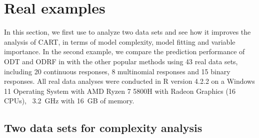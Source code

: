 \section{Real examples} \label{sec:examples}

In this section, we first use  to analyze two data sets and see how it improves the analysis of CART,  in terms of  model complexity, model fitting and variable importance. In the second example, we compare the prediction performance of ODT and ODRF in  with the other popular methods using 43 real data sets, including 20 continuous responses, 8 multinomial responses and 15 binary responses. All real data analyses were conducted in R version 4.2.2 on a Windows 11 Operating System with AMD Ryzen 7 5800H with Radeon Graphics (16 CPUs), ~3.2~GHz with 16~GB of memory.

\subsection{Two data sets for complexity analysis}

